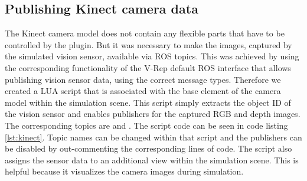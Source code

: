 \subsection{Publishing Kinect camera data}

The Kinect camera model does not contain any flexible parts that have to be controlled by the plugin. But it was necessary to make the images, captured by the simulated vision sensor, available via ROS topics. This was achieved by using the corresponding functionality of the V-Rep default ROS interface that allows publishing vision sensor data, using the correct message types. Therefore we created a LUA script that is associated with the base element of the camera model within the simulation scene. This script simply extracts the object ID of the vision sensor and enables publishers for the captured RGB and depth images. The corresponding topics are  and . The script code can be seen in code listing \ref{lst:kinect}. Topic names can be changed within that script and the publishers can be disabled by out-commenting the corresponding lines of code. The script also assigns the sensor data to an additional view within the simulation scene. This is helpful because it visualizes the camera images during simulation.

\lstset{style=customc}
\begin{minipage}{\linewidth}

\end{minipage} \\